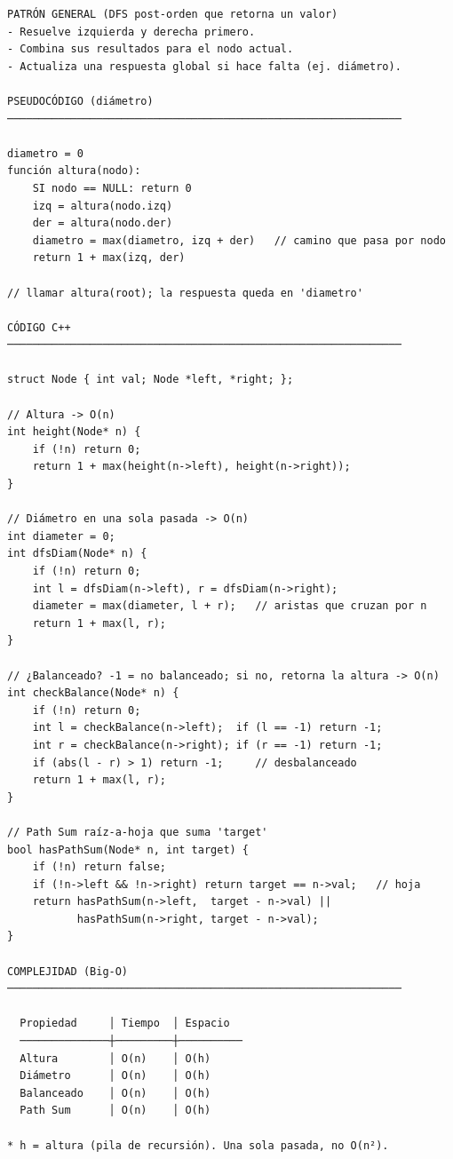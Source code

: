 \begin{lstlisting}
PATRÓN GENERAL (DFS post-orden que retorna un valor)
- Resuelve izquierda y derecha primero.
- Combina sus resultados para el nodo actual.
- Actualiza una respuesta global si hace falta (ej. diámetro).

PSEUDOCÓDIGO (diámetro)
──────────────────────────────────────────────────────────────

diametro = 0
función altura(nodo):
    SI nodo == NULL: return 0
    izq = altura(nodo.izq)
    der = altura(nodo.der)
    diametro = max(diametro, izq + der)   // camino que pasa por nodo
    return 1 + max(izq, der)

// llamar altura(root); la respuesta queda en 'diametro'

CÓDIGO C++
──────────────────────────────────────────────────────────────

struct Node { int val; Node *left, *right; };

// Altura -> O(n)
int height(Node* n) {
    if (!n) return 0;
    return 1 + max(height(n->left), height(n->right));
}

// Diámetro en una sola pasada -> O(n)
int diameter = 0;
int dfsDiam(Node* n) {
    if (!n) return 0;
    int l = dfsDiam(n->left), r = dfsDiam(n->right);
    diameter = max(diameter, l + r);   // aristas que cruzan por n
    return 1 + max(l, r);
}

// ¿Balanceado? -1 = no balanceado; si no, retorna la altura -> O(n)
int checkBalance(Node* n) {
    if (!n) return 0;
    int l = checkBalance(n->left);  if (l == -1) return -1;
    int r = checkBalance(n->right); if (r == -1) return -1;
    if (abs(l - r) > 1) return -1;     // desbalanceado
    return 1 + max(l, r);
}

// Path Sum raíz-a-hoja que suma 'target'
bool hasPathSum(Node* n, int target) {
    if (!n) return false;
    if (!n->left && !n->right) return target == n->val;   // hoja
    return hasPathSum(n->left,  target - n->val) ||
           hasPathSum(n->right, target - n->val);
}

COMPLEJIDAD (Big-O)
──────────────────────────────────────────────────────────────

  Propiedad     │ Tiempo  │ Espacio
  ──────────────┼─────────┼──────────
  Altura        │ O(n)    │ O(h)
  Diámetro      │ O(n)    │ O(h)
  Balanceado    │ O(n)    │ O(h)
  Path Sum      │ O(n)    │ O(h)

* h = altura (pila de recursión). Una sola pasada, no O(n²).
\end{lstlisting}

